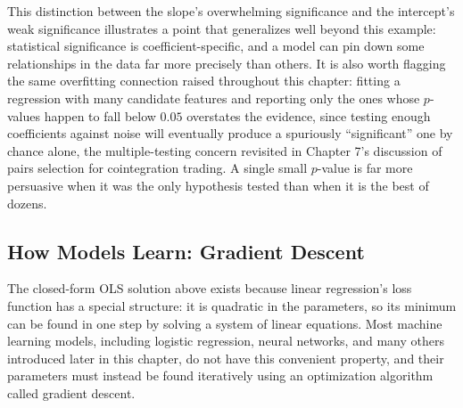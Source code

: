 \documentclass[../ai_in_finance]{subfiles}
\begin{document}
This distinction between the slope's overwhelming significance and the intercept's weak significance illustrates a point that generalizes well beyond this example: statistical significance is coefficient-specific, and a model can pin down some relationships in the data far more precisely than others. It is also worth flagging the same overfitting connection raised throughout this chapter: fitting a regression with many candidate features and reporting only the ones whose $p$-values happen to fall below $0.05$ overstates the evidence, since testing enough coefficients against noise will eventually produce a spuriously ``significant'' one by chance alone, the multiple-testing concern revisited in Chapter 7's discussion of pairs selection for cointegration trading. A single small $p$-value is far more persuasive when it was the only hypothesis tested than when it is the best of dozens.

\subsection{How Models Learn: Gradient Descent}
\label{sec:gradient-descent}

The closed-form OLS solution above exists because linear regression's loss function has a special structure: it is quadratic in the parameters, so its minimum can be found in one step by solving a system of linear equations. Most machine learning models, including logistic regression, neural networks, and many others introduced later in this chapter, do not have this convenient property, and their parameters must instead be found iteratively using an optimization algorithm called gradient descent.
\end{document}
